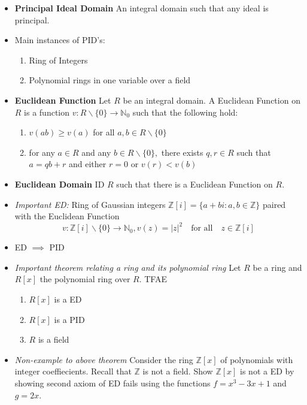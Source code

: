 \documentclass[a4paper, 12pt]
{article}
\newcommand{\z}{\mathbb{Z}}
\newcommand{\rpol}{R[x]}
\newcommand{\zpol}{\mathbb{Z}[x]}
\newcommand{\pol}[2]{#1[#2]}
\newcommand{\letter}[1]{$#1$}
\begin{document}
\begin{itemize}
		\item \textbf{Principal Ideal Domain} An integral domain such that any ideal is principal.
		
		\item Main instances of PID's:
		\begin{enumerate}
			\item Ring of Integers
			\item Polynomial rings in one variable over a field
		\end{enumerate}
		
		\item \textbf{Euclidean Function} Let \letter{R} be an integral domain. A Euclidean Function on \letter{R} is a function $v: R \backslash \{0\} \rightarrow \mathbb{N}_0$ such that the following hold:
					\begin{enumerate}[label=(\roman*)]
						\item $v(ab) \geq v(a)$ for all $a,b\in R \backslash \{0\}$
						\item for any $a\in R$ and any $b\in R \backslash \{0\},$ there exists $q,r\in R$ such that $a=qb+r$ and either $r=0$ or $v(r)<v(b)$
					\end{enumerate}
		\item \textbf{Euclidean Domain} ID \letter{R} such that there is a Euclidean Function on \letter{R.}
		
		\item \textit{Important ED:}
		Ring of Gaussian integers $\pol{\z}{i}=\{a+bi: a,b\in \mathbb{Z}\}$ paired with the Euclidean Function 
		$$v: \mathbb{Z}[i] \backslash \{0\} \longrightarrow \mathbb{N}_0, v(z) = |z|^2  \quad \text{for all} \quad z \in \pol{\z}{i}$$
		
		\item ED $\implies$ PID
		
		\item \textit{Important theorem relating a ring and its polynomial ring}
		Let \letter{R} be a ring and $\rpol$ the polynomial ring over \letter{R}. TFAE
					\begin{enumerate}[label=(\roman*)]
						\item $\rpol$ is a ED
						\item $\rpol$ is a PID
						\item $R$ is a field
					\end{enumerate}
					
		\item \textit{Non-example to above theorem}
		Consider the ring $\zpol$ of polynomials with integer coeffiecients. Recall that $\mathbb{Z}$ is not a field. Show $\zpol$ is not a ED by showing second axiom of ED fails using the functions $f=x^3-3x+1$ and $g=2x.$


\end{itemize}
\end{document}
